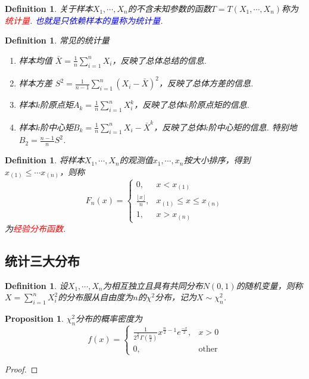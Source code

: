 \documentclass{article}
\newtheorem{proposition}[theorem]{Proposition}
\newtheorem{definition}[theorem]{Definition}
\newcommand{\redt}[1]{\textcolor{red}{#1}}
\newcommand{\bluet}[1]{\textcolor{blue}{#1}}
\begin{document}
\begin{definition}
\rm 关于样本$X_1,\cdots,X_n$的不含未知参数的函数$T=T(X_1,\cdots,X_n)$称为\redt{统计量}. \bluet{也就是只依赖样本的量称为统计量}.
\end{definition}

\begin{definition}
\rm 常见的统计量
\begin{enumerate}
	\item 样本均值 $\bar{X} = \frac{1}{n}\sum\limits_{i=1}^n X_i$，反映了总体总结的信息. 
	\item 样本方差 $S^2 = \frac{1}{n-1}\sum\limits_{i=1}^n(X_i-\bar{X})^2$，反映了总体方差的信息.
	\item 样本$k$阶原点矩$A_k = \frac{1}{n}\sum\limits_{i=1}^n X_i^k$，反映了总体$k$阶原点矩的信息.
	\item 样本$k$阶中心矩$B_k = \frac{1}{n}\sum\limits_{i=1}^n {X_i-\bar{X}}^k$，反映了总体$k$阶中心矩的信息. 特别地$B_2 = \frac{n-1}{n}S^2$.
\end{enumerate}
\end{definition}

\begin{definition}
\rm 将样本$X_1,\cdots,X_n$的观测值$x_1,\cdots,x_n$按大小排序，得到$x_{(1)} \leq \cdots x_{(n)}$，则称
$$
F_n(x) = \left\{
\begin{array}{ll}
0, & x <x_{(1)} \\
\frac{\lfloor x \rfloor}{n}, &  x_{(1)}\leq x \leq x_{(n)}\\
1, &x > x_{(n)}
\end{array} \right.
$$
为\redt{经验分布函数}.
\end{definition}

\subsection{统计三大分布}

\begin{definition}
\rm 设$X_1,\cdots,X_n$为相互独立且具有共同分布$N(0,1)$的随机变量，则称$X=\sum\limits_{i=1}^n X_i^2$的分布服从自由度为$n$的$\chi ^2$分布，记为$X \sim \chi_n^2$.
\end{definition}

\begin{proposition}
\rm $\chi_n^2$分布的概率密度为
$$
f(x) =  \left\{
\begin{array}{ll}
\frac{1}{2^\frac{n}{2}\Gamma(\frac{n}{2})} x^{\frac{n}{2}-1}e^{\frac{-x}{2}}, & x > 0 \\
0, & \text{other}
\end{array} \right. 
$$
\end{proposition}

\begin{proof}

\end{proof}
\end{document}
